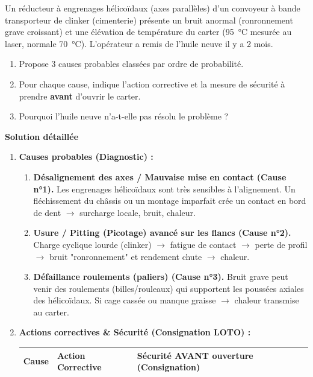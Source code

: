 \documentclass[11pt]{article}
\begin{document}
\begin{exoresolu}
    Un réducteur à engrenages hélicoïdaux (axes parallèles) d'un convoyeur à bande transporteur de clinker (cimenterie) présente un bruit anormal (ronronnement grave croissant) et une élévation de température du carter (\SI{95}{\celsius} mesurée au laser, normale \SI{70}{\celsius}). L'opérateur a remis de l'huile neuve il y a 2 mois.
    \begin{enumerate}
        \item Propose 3 causes probables classées par ordre de probabilité.
        \item Pour chaque cause, indique l'action corrective et la mesure de sécurité à prendre \textbf{avant} d'ouvrir le carter.
        \item Pourquoi l'huile neuve n'a-t-elle pas résolu le problème ?
    \end{enumerate}
    \tcblower
    \textbf{Solution détaillée}
    \begin{enumerate}
        \item \textbf{Causes probables (Diagnostic) :}
              \begin{enumerate}
                  \item \textbf{Désalignement des axes / Mauvaise mise en contact (Cause n°1).} Les engrenages hélicoïdaux sont très sensibles à l'alignement. Un fléchissement du châssis ou un montage imparfait crée un contact en bord de dent $\rightarrow$ surcharge locale, bruit, chaleur.
                  \item \textbf{Usure / Pitting (Picotage) avancé sur les flancs (Cause n°2).} Charge cyclique lourde (clinker) $\rightarrow$ fatigue de contact $\rightarrow$ perte de profil $\rightarrow$ bruit "ronronnement" et rendement chute $\rightarrow$ chaleur.
                  \item \textbf{Défaillance roulements (paliers) (Cause n°3).} Bruit grave peut venir des roulements (billes/rouleaux) qui supportent les poussées axiales des hélicoïdaux. Si cage cassée ou manque graisse $\rightarrow$ chaleur transmise au carter.
              \end{enumerate}
        \item \textbf{Actions correctives \& Sécurité (Consignation LOTO) :}
              \begin{center}
                  \begin{tabularx}{\linewidth}{|l|X|X|}\hline
                      \rowcolor{popblueL} \textbf{Cause} & \textbf{Action Corrective} & \textbf{Sécurité AVANT ouverture (Consignation)} \\ \hline

\end{tabularx}
\end{center}
\end{enumerate}
\end{exoresolu}
\end{document}
